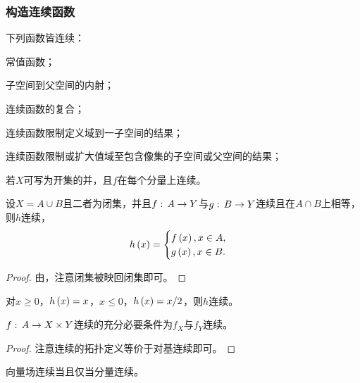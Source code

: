 \documentclass{ctexrep}
\begin{document}
  \subsubsection{构造连续函数}
  \begin{theorem}
    \label{thm:continauscontin}
    下列函数皆连续：
    \begin{cenum}
      \item 常值函数；
      \item 子空间到父空间的内射；
      \item 连续函数的复合；
      \item 连续函数限制定义域到一子空间的结果；
      \item 连续函数限制或扩大值域至包含像集的子空间或父空间的结果；
      \item 若$X$可写为开集的并，且$f$在每个分量上连续。
    \end{cenum}
  \end{theorem}
  \begin{theorem}[黏结引理]
    设$X=A\cup B$且二者为闭集，并且$f:\, A \rightarrow Y$与$g:\, B \rightarrow Y$连续且在$A\cap B$上相等，则$h$连续，
    \[ h\left(x\right)=\begin{cases}f\left(x\right), x\in A, \\ g\left(x\right), x\in B.\end{cases} \]
  \end{theorem}
  \begin{proof}
    由，注意闭集被映回闭集即可。
  \end{proof}
  \begin{ex}
    对$x\ge 0$，$h\left(x\right)=x$，$x\le 0$，$h\left(x\right)=x/2$，则$h$连续。
  \end{ex}
  \begin{theorem}
    \label{thm:continprod}
    $f:\, A \rightarrow X\times Y$连续的充分必要条件为$f_X$与$f_Y$连续。
  \end{theorem}
  \begin{proof}
    注意连续的拓扑定义等价于对基连续即可。
  \end{proof}
  \begin{ex}
    \label{ex:veccontin}
    向量场连续当且仅当分量连续。
  \end{ex}
\end{document}
